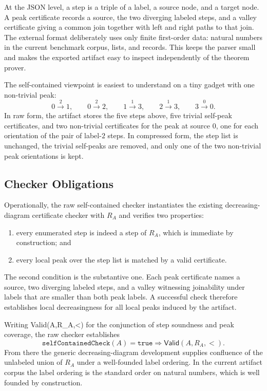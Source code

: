 \documentclass[submission,copyright,creativecommons]{eptcs}
\begin{document}
At the JSON level, a step is a triple of a label, a source node, and a target
node. A peak certificate records a source, the two diverging labeled steps, and
a valley certificate giving a common join together with left and right paths to
that join. The external format deliberately uses only finite first-order data:
natural numbers in the current benchmark corpus, lists, and records. This keeps
the parser small and makes the exported artifact easy to inspect independently
of the theorem prover.

The self-contained viewpoint is easiest to understand on a tiny gadget with one
non-trivial peak:
\[
  0 \xrightarrow{2} 1,\qquad
  0 \xrightarrow{2} 2,\qquad
  1 \xrightarrow{1} 3,\qquad
  2 \xrightarrow{1} 3,\qquad
  3 \xrightarrow{0} 0.
\]
In raw form, the artifact stores the five steps above, five trivial self-peak
certificates, and two non-trivial certificates for the peak at source $0$, one
for each orientation of the pair of label-$2$ steps. In compressed form, the
step list is unchanged, the trivial self-peaks are removed, and only one of the
two non-trivial peak orientations is kept.

\subsection{Checker Obligations}

Operationally, the raw self-contained checker instantiates the existing
decreasing-diagram certificate checker with $R_A$ and verifies two properties:
\begin{enumerate}
\item every enumerated step is indeed a step of $R_A$, which is immediate by
  construction; and
\item every local peak over the step list is matched by a valid certificate.
\end{enumerate}
The second condition is the substantive one. Each peak certificate names a
source, two diverging labeled steps, and a valley witnessing joinability under
labels that are smaller than both peak labels. A successful check therefore
establishes local decreasingness for all local peaks induced by the artifact.

Writing \textsf{Valid}(A,R_A,<) for the conjunction of step soundness and peak
coverage, the raw checker establishes
\[
  \texttt{selfContainedCheck}(A) = \texttt{true}
  \Longrightarrow
  \textsf{Valid}(A,R_A,<).
\]
From there the generic decreasing-diagram development supplies confluence of the
unlabeled union of $R_A$ under a well-founded label ordering. In the current
artifact corpus the label ordering is the standard order on natural numbers,
which is well founded by construction.
\end{document}
